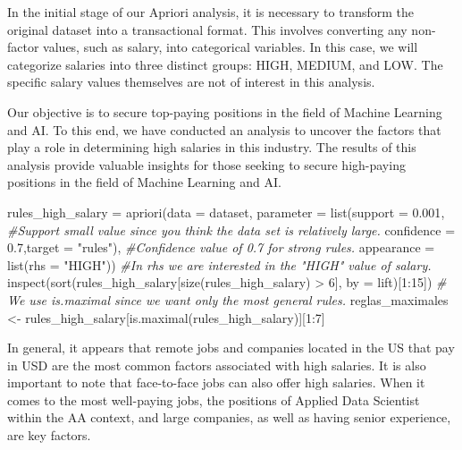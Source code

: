\documentclass[
]{article}
\newenvironment{Shaded}{\begin{snugshade}}{\end{snugshade}}
\newcommand{\AttributeTok}[1]{\textcolor[rgb]{0.77,0.63,0.00}{#1}}
\newcommand{\CommentTok}[1]{\textcolor[rgb]{0.56,0.35,0.01}{\textit{#1}}}
\newcommand{\DecValTok}[1]{\textcolor[rgb]{0.00,0.00,0.81}{#1}}
\newcommand{\FloatTok}[1]{\textcolor[rgb]{0.00,0.00,0.81}{#1}}
\newcommand{\FunctionTok}[1]{\textcolor[rgb]{0.00,0.00,0.00}{#1}}
\newcommand{\NormalTok}[1]{#1}
\newcommand{\OtherTok}[1]{\textcolor[rgb]{0.56,0.35,0.01}{#1}}
\newcommand{\SpecialCharTok}[1]{\textcolor[rgb]{0.00,0.00,0.00}{#1}}
\newcommand{\StringTok}[1]{\textcolor[rgb]{0.31,0.60,0.02}{#1}}
\begin{document}
In the initial stage of our Apriori analysis, it is necessary to
transform the original dataset into a transactional format. This
involves converting any non-factor values, such as salary, into
categorical variables. In this case, we will categorize salaries into
three distinct groups: HIGH, MEDIUM, and LOW. The specific salary values
themselves are not of interest in this analysis.

Our objective is to secure top-paying positions in the field of Machine
Learning and AI. To this end, we have conducted an analysis to uncover
the factors that play a role in determining high salaries in this
industry. The results of this analysis provide valuable insights for
those seeking to secure high-paying positions in the field of Machine
Learning and AI.

\scriptsize

\begin{Shaded}
\begin{Highlighting}[]
\NormalTok{rules\_high\_salary }\OtherTok{=} \FunctionTok{apriori}\NormalTok{(}\AttributeTok{data =}\NormalTok{ dataset, }
          \AttributeTok{parameter =} \FunctionTok{list}\NormalTok{(}\AttributeTok{support =} \FloatTok{0.001}\NormalTok{, }\CommentTok{\#Support small value since you think the data set is relatively large.}
          \AttributeTok{confidence =} \FloatTok{0.7}\NormalTok{,}\AttributeTok{target =} \StringTok{"rules"}\NormalTok{), }\CommentTok{\#Confidence value of 0.7 for strong rules.}
          \AttributeTok{appearance =} \FunctionTok{list}\NormalTok{(}\AttributeTok{rhs =} \StringTok{"HIGH"}\NormalTok{)) }\CommentTok{\#In rhs we are interested in the "HIGH" value of salary.}
 \FunctionTok{inspect}\NormalTok{(}\FunctionTok{sort}\NormalTok{(rules\_high\_salary[}\FunctionTok{size}\NormalTok{(rules\_high\_salary) }\SpecialCharTok{\textgreater{}} \DecValTok{6}\NormalTok{], }\AttributeTok{by =} \StringTok{\textquotesingle{}lift\textquotesingle{}}\NormalTok{)[}\DecValTok{1}\SpecialCharTok{:}\DecValTok{15}\NormalTok{])}
 \CommentTok{\# We use is.maximal since we want only the most general rules.}
\NormalTok{ reglas\_maximales }\OtherTok{\textless{}{-}}\NormalTok{ rules\_high\_salary[}\FunctionTok{is.maximal}\NormalTok{(rules\_high\_salary)][}\DecValTok{1}\SpecialCharTok{:}\DecValTok{7}\NormalTok{] }
\end{Highlighting}
\end{Shaded}

\normalsize

In general, it appears that remote jobs and companies located in the US
that pay in USD are the most common factors associated with high
salaries. It is also important to note that face-to-face jobs can also
offer high salaries. When it comes to the most well-paying jobs, the
positions of Applied Data Scientist within the AA context, and large
companies, as well as having senior experience, are key factors.
\end{document}
